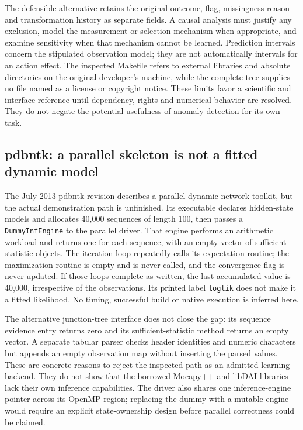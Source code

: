The defensible alternative retains the original outcome, flag, missingness
reason and transformation history as separate fields. A causal analysis must
justify any exclusion, model the measurement or selection mechanism when
appropriate, and examine sensitivity when that mechanism cannot be learned.
Prediction intervals concern the stipulated observation model; they are not
automatically intervals for an action effect. The inspected Makefile refers
to external libraries and absolute directories on the original developer's
machine, while the complete tree supplies no file named as a license or
copyright notice. These limits favor a scientific and interface reference
until dependency, rights and numerical behavior are resolved. They do not
negate the potential usefulness of anomaly detection for its own task.
\citep{rel19eisadbn}

\subsection{pdbntk: a parallel skeleton is not a fitted dynamic model}
\label{rel19:pdbntk}

The July 2013 pdbntk revision describes a parallel dynamic-network toolkit,
but the actual demonstration path is unfinished. Its executable declares
hidden-state models and allocates 40,000 sequences of length 100, then passes
a \texttt{DummyInfEngine} to the parallel driver. That engine performs an
arithmetic workload and returns one for each sequence, with an empty vector
of sufficient-statistic objects. The iteration loop repeatedly calls its
expectation routine; the maximization routine is empty and is never called,
and the convergence flag is never updated. If those loops complete as written,
the last accumulated value is 40,000, irrespective of the observations. Its
printed label \texttt{loglik} does not make it a fitted likelihood. No timing,
successful build or native execution is inferred here. \citep{rel19pdbntk,rel19dbnwitness}

The alternative junction-tree interface does not close the gap: its sequence
evidence entry returns zero and its sufficient-statistic method returns an
empty vector. A separate tabular parser checks header identities and numeric
characters but appends an empty observation map without inserting the parsed
values. These are concrete reasons to reject the inspected path as an admitted
learning backend. They do not show that the borrowed Mocapy++ and libDAI
libraries lack their own inference capabilities. The driver also shares one
inference-engine pointer across its OpenMP region; replacing the dummy with
a mutable engine would require an explicit state-ownership design before
parallel correctness could be claimed. \citep{rel19pdbntk}


